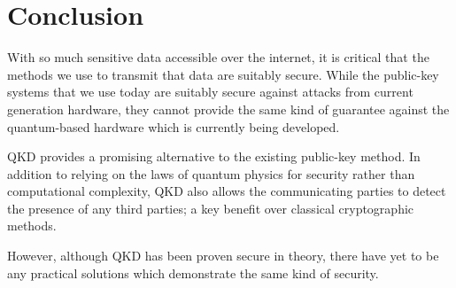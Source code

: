 \documentclass[runningheads,a4paper]{llncs}
\begin{document}
\section{Conclusion}

With so much sensitive data accessible over the internet, it is critical that the methods we use to transmit that data are suitably secure. While the public-key systems that we use today are suitably secure against attacks from current generation hardware, they cannot provide the same kind of guarantee against the quantum-based hardware which is currently being developed.

QKD provides a promising alternative to the existing public-key method. In addition to relying on the laws of quantum physics for security rather than computational complexity, QKD also allows the communicating parties to detect the presence of any third parties; a key benefit over classical cryptographic methods.

However, although QKD has been proven secure in theory, there have yet to be any practical solutions which demonstrate the same kind of security. 



\end{document}
